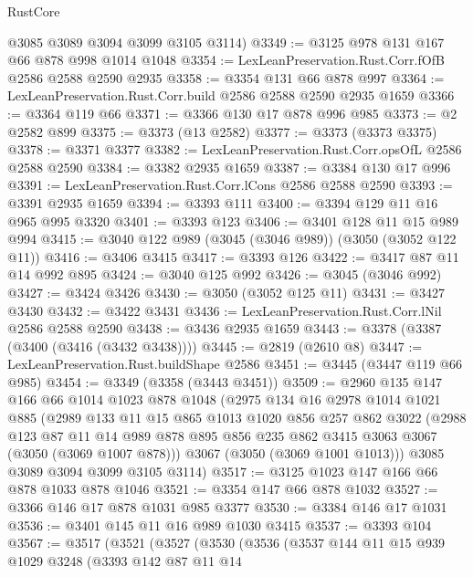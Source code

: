 \begin{lexlean}{RustCore}
\begin{coremodule}
      @3085
      @3089
      @3094
      @3099
      @3105
      @3114)
@3349 := @3125 @978 @131 @167 @66 @878 @998 @1014 @1048
@3354 := LexLeanPreservation.Rust.Corr.fOfB @2586 @2588 @2590 @2935
@3358 := @3354 @131 @66 @878 @997
@3364 := LexLeanPreservation.Rust.Corr.build @2586 @2588 @2590 @2935 @1659
@3366 := @3364 @119 @66
@3371 := @3366 @130 @17 @878 @996 @985
@3373 := @2 @2582 @899
@3375 := @3373 (@13 @2582)
@3377 := @3373 (@3373 @3375)
@3378 := @3371 @3377
@3382 := LexLeanPreservation.Rust.Corr.opsOfL @2586 @2588 @2590
@3384 := @3382 @2935 @1659
@3387 := @3384 @130 @17 @996
@3391 := LexLeanPreservation.Rust.Corr.lCons @2586 @2588 @2590
@3393 := @3391 @2935 @1659
@3394 := @3393 @111
@3400 := @3394 @129 @11 @16 @965 @995 @3320
@3401 := @3393 @123
@3406 := @3401 @128 @11 @15 @989 @994
@3415 := @3040 @122 @989 (@3045 (@3046 @989)) (@3050 (@3052 @122 @11))
@3416 := @3406 @3415
@3417 := @3393 @126
@3422 := @3417 @87 @11 @14 @992 @895
@3424 := @3040 @125 @992
@3426 := @3045 (@3046 @992)
@3427 := @3424 @3426
@3430 := @3050 (@3052 @125 @11)
@3431 := @3427 @3430
@3432 := @3422 @3431
@3436 := LexLeanPreservation.Rust.Corr.lNil @2586 @2588 @2590
@3438 := @3436 @2935 @1659
@3443 := @3378 (@3387 (@3400 (@3416 (@3432 @3438))))
@3445 := @2819 (@2610 @8)
@3447 := LexLeanPreservation.Rust.buildShape @2586
@3451 := @3445 (@3447 @119 @66 @985)
@3454 := @3349 (@3358 (@3443 @3451))
@3509 := @2960
    @135
    @147
    @166
    @66
    @1014
    @1023
    @878
    @1048
    (@2975
      @134
      @16
      @2978
      @1014
      @1021
      @885
      (@2989
        @133
        @11
        @15
        @865
        @1013
        @1020
        @856
        @257
        @862
        @3022
        (@2988
          @123
          @87
          @11
          @14
          @989
          @878
          @895
          @856
          @235
          @862
          @3415
          @3063
          @3067
          (@3050 (@3069 @1007 @878)))
        @3067
        (@3050 (@3069 @1001 @1013)))
      @3085
      @3089
      @3094
      @3099
      @3105
      @3114)
@3517 := @3125 @1023 @147 @166 @66 @878 @1033 @878 @1046
@3521 := @3354 @147 @66 @878 @1032
@3527 := @3366 @146 @17 @878 @1031 @985 @3377
@3530 := @3384 @146 @17 @1031
@3536 := @3401 @145 @11 @16 @989 @1030 @3415
@3537 := @3393 @104
@3567 := @3517
    (@3521
      (@3527
        (@3530
          (@3536
            (@3537
              @144
              @11
              @15
              @939
              @1029
              @3248
              (@3393
                @142
                @87
                @11
                @14

\end{coremodule}
\end{lexlean}
